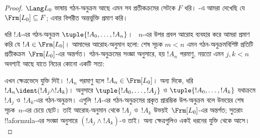 \documentclass[../../../include/open-logic-section]{subfiles}
\begin{document}
\begin{proof}
$\Lang L_0$ ভাষায় গঠন-অনুক্রম আছে এমন সব প্রতীকক্রমের সেটকে $F$ ধরি।
-এ আমরা দেখেছি যে
$\Frm[L_0] \subseteq F$; এবার বিপরীত অন্তর্ভুক্তি প্রমাণ করি।

ধরি $!A$-এর গঠন-অনুক্রম $\tuple{!A_0,\dotsc,!A_n}$।
~$n$-এর উপর প্রবল আরোহ ব্যবহার করে আমরা প্রমাণ করি যে
$!A \in \Frm[L_0]$। আমাদের আরোহ-অনুমান হলো: শেষ সূচক $m < n$ এমন
গঠন-অনুক্রমবিশিষ্ট প্রতিটি প্রতীকক্রম~$\Frm[L_0]$-এর অন্তর্গত।
গঠন-অনুক্রমের সংজ্ঞা অনুসারে, হয় $!A_n$ পরমাণু, নয়তো এমন $j,k < n$
অবশ্যই আছে যাতে নিচের কোনো একটি সত্য:
\begin{enumerate}
\end{enumerate}
এখন ক্ষেত্রভেদে যুক্তি দিই। $!A_n$ পরমাণু হলে
$!A_n \in \Frm[L_0]$। অন্য দিকে, ধরি $!A_n \ident
(!A_j \land !A_k)$।  অনুসারে
$\tuple{!A_0,\dotsc,!A_j}$ ও $\tuple{!A_0,\dotsc,!A_k}$ যথাক্রমে
$!A_j$ ও~$!A_k$-এর গঠন-অনুক্রম। এগুলি~$!A$-এর গঠন-অনুক্রমের প্রকৃত
প্রারম্ভিক উপ-অনুক্রম বলে উভয়ের শেষ সূচক~$n$-এর চেয়ে ছোট। তাই
আরোহ-অনুমান থেকে $!A_j$ ও~$!A_k$ উভয়ই~$\Frm[L_0]$-এর অন্তর্গত;
সুতরাং !!a{formula}-এর সংজ্ঞা অনুসারে
$(!A_j \land !A_k)$-ও তাই। অন্য ক্ষেত্রগুলিও একই ধরনের যুক্তি থেকে আসে।
\end{proof}
\end{document}
